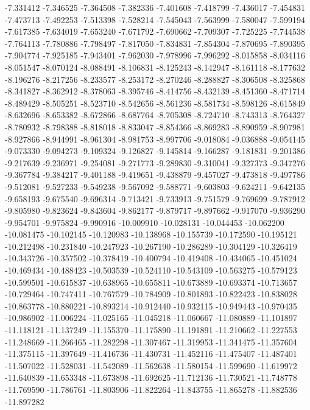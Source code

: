 -7.331412
-7.346525
-7.364508
-7.382336
-7.401608
-7.418799
-7.436017
-7.454831
-7.473713
-7.492253
-7.513398
-7.528214
-7.545043
-7.563999
-7.580047
-7.599194
-7.617385
-7.634019
-7.653240
-7.671792
-7.690662
-7.709307
-7.725225
-7.744538
-7.764113
-7.780886
-7.798497
-7.817050
-7.834831
-7.854304
-7.870695
-7.890395
-7.904774
-7.925185
-7.943401
-7.962030
-7.978996
-7.996292
-8.015858
-8.034116
-8.051547
-8.070124
-8.088491
-8.106831
-8.125243
-8.142947
-8.161118
-8.177632
-8.196276
-8.217256
-8.233577
-8.253172
-8.270246
-8.288827
-8.306508
-8.325868
-8.341827
-8.362912
-8.378063
-8.395746
-8.414756
-8.432139
-8.451360
-8.471714
-8.489429
-8.505251
-8.523710
-8.542656
-8.561236
-8.581734
-8.598126
-8.615849
-8.632696
-8.653382
-8.672866
-8.687764
-8.705308
-8.724710
-8.743313
-8.764327
-8.780932
-8.798388
-8.818018
-8.833047
-8.854366
-8.869283
-8.890959
-8.907981
-8.927866
-8.944991
-8.961304
-8.981753
-8.997706
-9.018084
-9.036888
-9.054145
-9.073330
-9.094273
-9.109324
-9.126827
-9.145814
-9.166287
-9.181831
-9.201386
-9.217639
-9.236971
-9.254081
-9.271773
-9.289830
-9.310041
-9.327373
-9.347276
-9.367784
-9.384217
-9.401188
-9.419651
-9.438879
-9.457027
-9.473818
-9.497786
-9.512081
-9.527233
-9.549238
-9.567092
-9.588771
-9.603803
-9.624211
-9.642135
-9.658193
-9.675540
-9.696314
-9.713421
-9.733913
-9.751579
-9.769699
-9.787912
-9.805980
-9.823624
-9.843604
-9.862177
-9.879717
-9.897662
-9.917070
-9.936290
-9.954701
-9.975824
-9.990916
-10.009910
-10.028131
-10.044453
-10.062200
-10.081475
-10.102145
-10.120983
-10.138968
-10.155739
-10.172590
-10.195121
-10.212498
-10.231840
-10.247923
-10.267190
-10.286289
-10.304129
-10.326419
-10.343726
-10.357502
-10.378419
-10.400794
-10.419408
-10.434065
-10.451024
-10.469434
-10.488423
-10.503539
-10.524110
-10.543109
-10.563275
-10.579123
-10.599501
-10.615837
-10.638965
-10.655811
-10.673889
-10.693374
-10.713657
-10.729464
-10.747411
-10.767579
-10.784909
-10.801893
-10.822423
-10.838028
-10.863778
-10.880221
-10.893214
-10.912440
-10.932115
-10.949443
-10.970435
-10.986902
-11.006224
-11.025165
-11.045218
-11.060667
-11.080889
-11.101897
-11.118121
-11.137249
-11.155370
-11.175890
-11.191891
-11.210662
-11.227553
-11.248669
-11.266465
-11.282298
-11.307467
-11.319953
-11.341475
-11.357604
-11.375115
-11.397649
-11.416736
-11.430731
-11.452116
-11.475407
-11.487401
-11.507022
-11.528031
-11.542089
-11.562638
-11.580154
-11.599690
-11.619972
-11.640839
-11.653348
-11.673898
-11.692625
-11.712136
-11.730521
-11.748778
-11.769590
-11.786761
-11.803906
-11.822264
-11.843755
-11.865278
-11.882536
-11.897282
